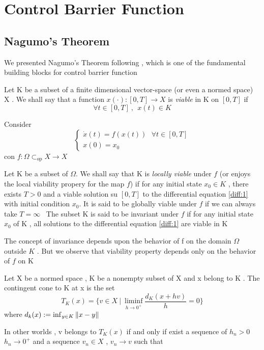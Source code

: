 \chapter{Control Barrier Function}

\section{Nagumo's Theorem}
We presented Nagumo's Theorem following   \cite{VT} , which is one of the fundamental building blocks for control barrier function
\begin{definizione}
Let K be a subset of a finite dimensional vector-space (or even a normed space) X . We shall say that a function $x (\cdot) : [0,T] \rightarrow X$ is \textit{viable} in K on $[0,T]$ if 
	$$\forall t \in [0,T] \ , \ \ x(t) \in K$$ 
\end{definizione}
Consider 
\begin{equation}
	\label{diff:1}
	\begin{cases}
		\dot{x}(t)= f(x(t)) \ \ \ \forall t \in [0,T ] \\ 
		x(0) = x_0
	\end{cases}
\end{equation}
con $f : \Omega \subset_{\text{op}} X \rightarrow X$ 
\begin{definizione}
	Let K be a subset of  $\Omega$. 
We shall say that K is \textit{ locally viable} under $f$ (or enjoys the local viability propery for the map $f$) if for any initial state  $x_0 \in K $ , there exists $T > 0$ and  a viable solution  su $[0,T]$  to the differential equation \ref{diff:1} with initial condition $x_0$. 
It is said to be globally viable under $f$  if we can always take $T= \infty$ \ 
The subset K is said to be invariant under $f$ if for any initial state $x_0$ of K , all solutions to the differential equation  \ref{diff:1} are viable in K 
\end{definizione}
The concept of invariance depends upon the behavior of f on the domain $\Omega$ outside $K$ . But we observe that viability property depends only on the behavior of $f$ on K 
\begin{definizione}
	Let X be a normed space , K be a nonempty subset of X and x belong to K . The contingent cone to K at x is the set
	$$T_K(x)= \{v \in X \ | \ \liminf_{h\rightarrow 0^+ }\frac{d_K(x+hv)}{h}=0\}$$
	where $d_k(x):= \inf_{y \in K } \norm{x-y}$
\end{definizione}
In other worlds , v belongs to
$T_K(x)$ if and only if exist a sequence of  $h_n >0$ $h_n \rightarrow 0^+$ and a sequence $v_n \in X$ , $v_n \rightarrow v $ such that
